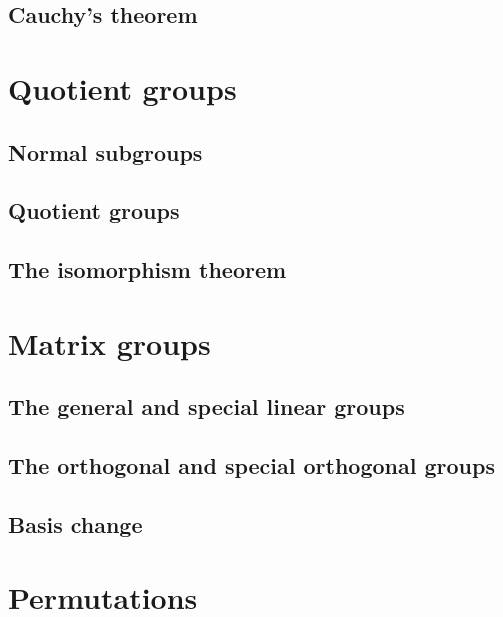 \documentclass[main.tex]{subfiles}
\begin{document}
			\subsection{Cauchy's theorem}
			
		\section{Quotient groups}
			\subsection{Normal subgroups}
			
			\subsection{Quotient groups}
			
			\subsection{The isomorphism theorem}
			
		\section{Matrix groups}
			\subsection{The general and special linear groups}
			
			\subsection{The orthogonal and special orthogonal groups}
			
			\subsection{Basis change}
			
		\section{Permutations}
\end{document}
